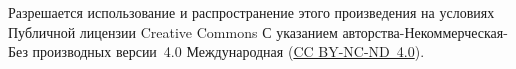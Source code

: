 

\vspace*{\fill}
\noindent Разрешается использование и распространение этого
произведения на условиях Публичной лицензии Creative Commons
С указанием авторства-Неком\-мерческая-Без производных
версии~4.0 Международная
(\href{https://creativecommons.org/licenses/by-nc-nd/4.0/legalcode.ru}%
{CC BY-NC-ND~4.0}).

\tableofcontents

